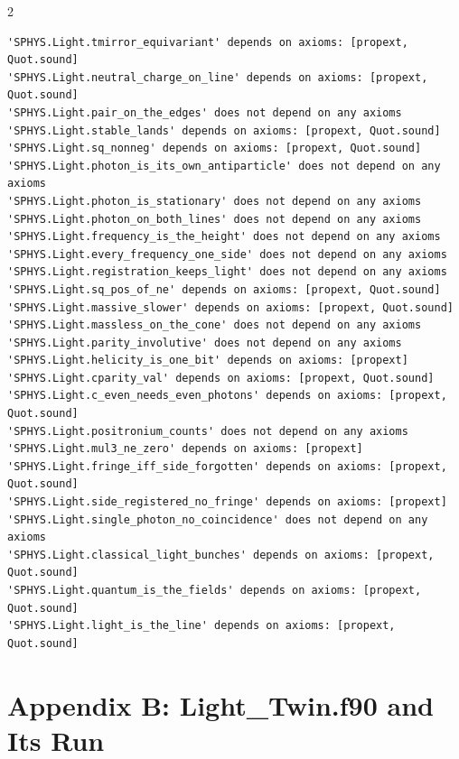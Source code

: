 \documentclass[10pt]{article}
\begin{document}
\begin{multicols}{2}
\begin{Verbatim}[fontsize=\fontsize{6.0}{6.9}\selectfont,breaklines,breakanywhere,breaksymbolleft={}]
'SPHYS.Light.tmirror_equivariant' depends on axioms: [propext, Quot.sound]
'SPHYS.Light.neutral_charge_on_line' depends on axioms: [propext, Quot.sound]
'SPHYS.Light.pair_on_the_edges' does not depend on any axioms
'SPHYS.Light.stable_lands' depends on axioms: [propext, Quot.sound]
'SPHYS.Light.sq_nonneg' depends on axioms: [propext, Quot.sound]
'SPHYS.Light.photon_is_its_own_antiparticle' does not depend on any axioms
'SPHYS.Light.photon_is_stationary' does not depend on any axioms
'SPHYS.Light.photon_on_both_lines' does not depend on any axioms
'SPHYS.Light.frequency_is_the_height' does not depend on any axioms
'SPHYS.Light.every_frequency_one_side' does not depend on any axioms
'SPHYS.Light.registration_keeps_light' does not depend on any axioms
'SPHYS.Light.sq_pos_of_ne' depends on axioms: [propext, Quot.sound]
'SPHYS.Light.massive_slower' depends on axioms: [propext, Quot.sound]
'SPHYS.Light.massless_on_the_cone' does not depend on any axioms
'SPHYS.Light.parity_involutive' does not depend on any axioms
'SPHYS.Light.helicity_is_one_bit' depends on axioms: [propext]
'SPHYS.Light.cparity_val' depends on axioms: [propext, Quot.sound]
'SPHYS.Light.c_even_needs_even_photons' depends on axioms: [propext, Quot.sound]
'SPHYS.Light.positronium_counts' does not depend on any axioms
'SPHYS.Light.mul3_ne_zero' depends on axioms: [propext]
'SPHYS.Light.fringe_iff_side_forgotten' depends on axioms: [propext, Quot.sound]
'SPHYS.Light.side_registered_no_fringe' depends on axioms: [propext]
'SPHYS.Light.single_photon_no_coincidence' does not depend on any axioms
'SPHYS.Light.classical_light_bunches' depends on axioms: [propext, Quot.sound]
'SPHYS.Light.quantum_is_the_fields' depends on axioms: [propext, Quot.sound]
'SPHYS.Light.light_is_the_line' depends on axioms: [propext, Quot.sound]
\end{Verbatim}
\end{multicols}

\hypertarget{appendix-b-light_twin.f90-and-its-run}{%
\section{Appendix B: Light\_Twin.f90 and Its
Run}\label{appendix-b-light_twin.f90-and-its-run}}
\end{document}
